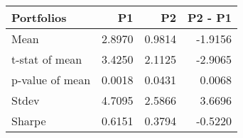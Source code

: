 \begin{tabular}{lrrr}
\toprule
Portfolios & P1 & P2 & P2 - P1 \\
\midrule
Mean & 2.8970 & 0.9814 & -1.9156 \\
t-stat of mean & 3.4250 & 2.1125 & -2.9065 \\
p-value of mean & 0.0018 & 0.0431 & 0.0068 \\
Stdev & 4.7095 & 2.5866 & 3.6696 \\
Sharpe & 0.6151 & 0.3794 & -0.5220 \\
\bottomrule
\end{tabular}
